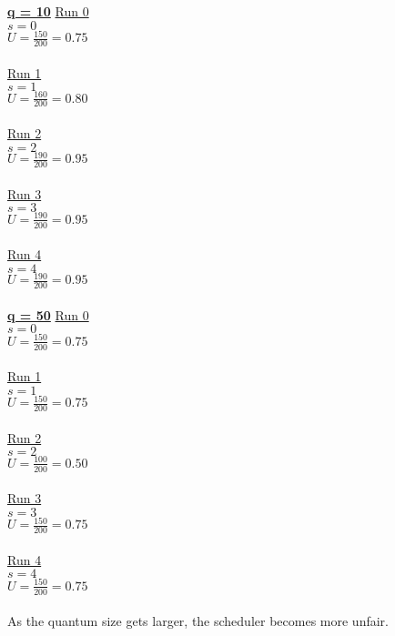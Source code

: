 \documentclass{article}
\begin{document}
\begin{enumerate}
    \underline{\textbf{q = 10}}
    \underline{Run 0}\\
    $s = 0$ \\
    $U = \frac{150}{200} = 0.75$\\\\
    \underline{Run 1}\\
    $s = 1$\\
    $U = \frac{160}{200} = 0.80$\\\\
    \underline{Run 2}\\
    $s = 2$\\
    $U = \frac{190}{200} = 0.95$\\\\
    \underline{Run 3} \\
    $s = 3$\\
    $U = \frac{190}{200} = 0.95$\\\\
    \underline{Run 4}\\
    $s = 4$\\
    $U = \frac{190}{200} = 0.95$\\\\

    \underline{\textbf{q = 50}}
    \underline{Run 0}\\
    $s = 0$ \\
    $U = \frac{150}{200} = 0.75$\\\\
    \underline{Run 1}\\
    $s = 1$\\
    $U = \frac{150}{200} = 0.75$\\\\
    \underline{Run 2}\\
    $s = 2$\\
    $U = \frac{100}{200} = 0.50$\\\\
    \underline{Run 3} \\
    $s = 3$\\
    $U = \frac{150}{200} = 0.75$\\\\
    \underline{Run 4}\\
    $s = 4$\\
    $U = \frac{150}{200} = 0.75$\\\\

    As the quantum size gets larger, the scheduler becomes more unfair.


\end{enumerate}
\end{document}
